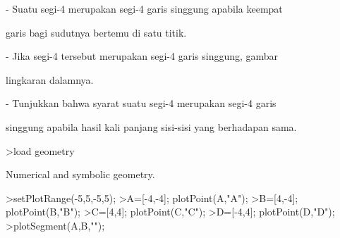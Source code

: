 \documentclass[a4paper,10pt]{article}
\begin{document}
\begin{eulernotebook}
\begin{eulercomment}
\begin{eulercomment}
\begin{eulercomment}
\begin{eulercomment}
\begin{eulercomment}
\begin{eulercomment}
\begin{eulercomment}
\begin{eulercomment}
\begin{eulercomment}
\begin{eulercomment}
\begin{eulercomment}
\begin{eulercomment}
\begin{eulercomment}
\begin{eulercomment}
\begin{eulercomment}
\begin{eulercomment}
\begin{eulercomment}
\begin{eulercomment}
\begin{eulercomment}
\begin{eulercomment}
\begin{eulercomment}
\begin{eulercomment}
\begin{eulercomment}
\begin{eulercomment}
\begin{eulercomment}
\begin{eulercomment}
\begin{eulercomment}
\begin{eulercomment}
\begin{eulercomment}
\begin{eulercomment}
\begin{eulercomment}
\begin{eulercomment}
\begin{eulercomment}
\begin{eulercomment}
\begin{eulercomment}
\begin{eulercomment}
\begin{eulercomment}
\begin{eulercomment}
\begin{eulercomment}
\begin{eulercomment}
\begin{eulercomment}
\begin{eulercomment}
\begin{eulerttcomment}
   - Suatu segi-4 merupakan segi-4 garis singgung apabila keempat
\end{eulerttcomment}
\begin{eulercomment}
garis bagi sudutnya bertemu di satu titik.\\
\end{eulercomment}
\begin{eulerttcomment}
   - Jika segi-4 tersebut merupakan segi-4 garis singgung, gambar
\end{eulerttcomment}
\begin{eulercomment}
lingkaran dalamnya.\\
\end{eulercomment}
\begin{eulerttcomment}
   - Tunjukkan bahwa syarat suatu segi-4 merupakan segi-4 garis
\end{eulerttcomment}
\begin{eulercomment}
singgung apabila hasil kali panjang sisi-sisi yang berhadapan sama.
\end{eulercomment}
\begin{eulerprompt}
>load geometry
\end{eulerprompt}
\begin{euleroutput}
  Numerical and symbolic geometry.
\end{euleroutput}
\begin{eulerprompt}
>setPlotRange(-5,5,-5,5);
>A=[-4,-4]; plotPoint(A,"A");
>B=[4,-4]; plotPoint(B,"B");
>C=[4,4]; plotPoint(C,"C");
>D=[-4,4]; plotPoint(D,"D");
>plotSegment(A,B,"");

\end{eulerprompt}
\end{eulercomment}
\end{eulercomment}
\end{eulercomment}
\end{eulercomment}
\end{eulercomment}
\end{eulercomment}
\end{eulercomment}
\end{eulercomment}
\end{eulercomment}
\end{eulercomment}
\end{eulercomment}
\end{eulercomment}
\end{eulercomment}
\end{eulercomment}
\end{eulercomment}
\end{eulercomment}
\end{eulercomment}
\end{eulercomment}
\end{eulercomment}
\end{eulercomment}
\end{eulercomment}
\end{eulercomment}
\end{eulercomment}
\end{eulercomment}
\end{eulercomment}
\end{eulercomment}
\end{eulercomment}
\end{eulercomment}
\end{eulercomment}
\end{eulercomment}
\end{eulercomment}
\end{eulercomment}
\end{eulercomment}
\end{eulercomment}
\end{eulercomment}
\end{eulercomment}
\end{eulercomment}
\end{eulercomment}
\end{eulercomment}
\end{eulercomment}
\end{eulercomment}
\end{eulercomment}
\end{eulernotebook}
\end{document}
